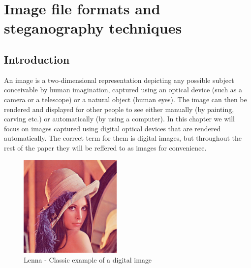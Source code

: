 
\chapter{Image file formats and steganography techniques}

\section{Introduction}

\setlength\columnsep{20pt}
\begin{multicols*}{2}
An image is a two-dimensional representation depicting any possible subject conceivable by human imagination, captured using an optical device (such as a camera or a telescope) or a natural object (human eyes). The image can then be rendered and displayed for other people to see either manually (by painting, carving etc.) or automatically (by using a computer). In this chapter we will focus on images captured using digital optical devices that are rendered automatically. The correct term for them is digital images, but throughout the rest of the paper they will be reffered to as images for convenience.

\begin{figure}[H]
    \centering
    \includegraphics[width=5cm,height=5cm,keepaspectratio]{pics/lenna}
    \caption{Lenna - Classic example of a digital image}
    \label{Lenna}
\end{figure}


\end{multicols*}
